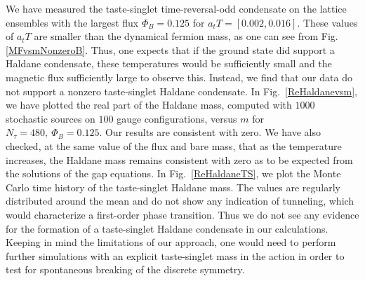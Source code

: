 \documentclass[aps,prd,twocolumn,showpacs,superscriptaddress,groupedaddress]{revtex4}  %
\begin{document}
We have measured the taste-singlet time-reversal-odd condensate on the lattice ensembles with the largest flux $\Phi_B=0.125$ for $a_t T = [0.002, 0.016]$. These values of $a_tT$ are smaller than the dynamical fermion mass, as one can see from Fig. \ref{MFvsmNonzeroB}. Thus, one expects that if the ground state did support a Haldane condensate, these temperatures would be sufficiently small and the magnetic flux sufficiently large to observe this. Instead, we find that our data do not support a nonzero taste-singlet Haldane condensate. In Fig.~\ref{ReHaldanevsm}, we have plotted the real part of the Haldane mass, computed with $1000$ stochastic sources on $100$ gauge configurations, versus $m$ for $N_{\tau}=480,~\Phi_B=0.125$. Our results are consistent with zero. We have also checked, at the same value of the flux and bare mass, that as the temperature increases, the Haldane mass remains consistent with zero as to be expected from the solutions of the gap equations. In Fig.~\ref{ReHaldaneTS}, we plot the Monte Carlo time history of the taste-singlet Haldane mass. The values are regularly distributed around the mean and do not show any indication of tunneling, which would characterize a first-order phase transition. Thus we do not see any evidence for the formation of a taste-singlet Haldane condensate in our calculations. Keeping in mind the limitations of our approach, one would need to perform further simulations with an explicit taste-singlet mass in the action in order to test for spontaneous breaking of the discrete symmetry.


\end{document}
